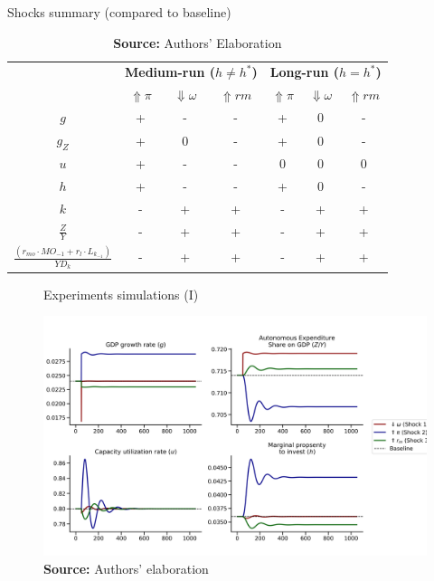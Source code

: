 \documentclass[11pt]{article}
\begin{document}
\begin{table}[H]
	\centering
	\caption{Shocks summary (compared to baseline)}
	\label{ResumoChoques}
		\begin{tabular}{c|c|c|c||c|c|c}
			\hline\hline
			\multirow{2}{*}{} & \multicolumn{3}{c||}{\textbf{Medium-run ($h \neq h^*$)}} & \multicolumn{3}{c}{\textbf{Long-run ($h = h^*$)}} \\ \cline{2-7} 
			&  \textbf{$\Uparrow \pi$} & \textbf{$\Downarrow \omega$} & \textbf{$\Uparrow rm$} &  \textbf{$\Uparrow \pi$} & \textbf{$\Downarrow \omega$} & \textbf{$\Uparrow rm$} \\ \hline
			\textbf{$g$}  & + & - & - & + & 0 & - \\ \hline
			\textbf{$g_Z$}  & + & 0 & -  & + & 0 & - \\ \hline
			\textbf{$u$}  & + & - & -  & 0 & 0 & 0 \\ \hline
			\textbf{$h$}  & + & - & -  & + & 0 & - \\ \hline
			\textbf{$k$}  & - & + & +  & - & + & + \\ \hline
			\textbf{$\frac{Z}{Y}$}  & - & + & +  & - & + & + \\ \hline
			\textit{$\frac{(r_{mo}\cdot MO_{-1} + r_l\cdot L_{k_{-1}})}{YD_k}$}  & - & + & +  & - & + & + \\ \hline\hline
		\end{tabular}%
	\caption*{\textbf{Source:} Authors' Elaboration}
\end{table}



\begin{figure}[htb]
	\centering
	\caption{Experiments simulations (I)}
	\label{fig:results_1}
	\includegraphics[width=.8\textwidth]{./figs/Compared_Shocks_1.png}
	\caption*{\textbf{Source:} Authors' elaboration}
\end{figure}
\end{document}
